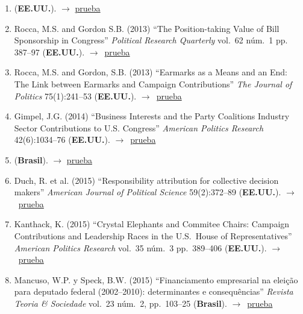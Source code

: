 \documentclass[12 pt, letter]{article}
\newenvironment{CitasMiTrabajo}{
    \begin{footnotesize}
    \begin{enumerate}[label={\footnotesize\emph{cita~\arabic*}},ref=\arabic*] %
        \setlength{\itemsep}{.1\itemsep}
        \setlength{\parskip}{.1\parskip}
    }{\end{enumerate}\end{footnotesize}}
\begin{document}
\begin{CitasMiTrabajo}
        \item {} (\textbf{EE.UU.}). $\rightarrow$ \href{http://ericmagar.com/cv/cites/coxMagar/jenkins.monroeBuyNegAgenda2012ajps.pdf}{prueba}

        \item Rocca, M.S. and Gordon S.B. (2013) ``The Position-taking Value of Bill Sponsorship in Congress'' \emph{Political Research Quarterly} vol.\ 62 n\'um.\ 1 pp. 387--97 (\textbf{EE.UU.}). $\rightarrow$~\href{http://ericmagar.com/cv/cites/coxMagar/rocca.gordonPosTakSponsoring2010prq.pdf}{prueba}

        \item Rocca, M.S. and Gordon, S.B. (2013) ``Earmarks as a Means and an End: The Link between Earmarks and Campaign Contributions'' \emph{The Journal of Politics} 75(1):241--53 (\textbf{EE.UU.}). $\rightarrow$~\href{http://ericmagar.com/cv/cites/coxMagar/rocca.gordonEarmarks2013jop.pdf}{prueba}

        \item Gimpel, J.G. (2014) ``Business Interests and the Party Coalitions Industry Sector Contributions to U.S. Congress'' \emph{American Politics Research} 42(6):1034--76 (\textbf{EE.UU.}). $\rightarrow$~\href{http://ericmagar.com/cv/cites/coxMagar/gimpel.etalBusPacs2014apr.pdf}{prueba}

        \item {} (\textbf{Brasil}). $\rightarrow$ \href{http://ericmagar.com/cv/cites/coxMagar/castroAccountBrasil2014opPub.pdf}{prueba}

        \item Duch, R. et al. (2015) ``Responsibility attribution for collective decision makers'' \emph{American Journal of Political Science} 59(2):372--89 (\textbf{EE.UU.}). $\rightarrow$~\href{http://ericmagar.com/cv/cites/coxMagar/duch.etalAttribution2015ajps.pdf}{prueba}

        \item Kanthack, K. (2015) ``Crystal Elephants and Commitee Chairs: Campaign Contributions and Leadership Races in the U.S.\ House of Representatives'' \emph{American Politics Research} vol.\ 35 n\'um.\ 3 pp.\ 389--406 (\textbf{EE.UU.}). $\rightarrow$~\href{http://ericmagar.com/cv/cites/coxMagar/kanthak.ContributionsChairs2007apr.pdf}{prueba}

        \item Mancuso, W.P. y Speck, B.W. (2015)
        ``Financiamento empresarial na elei{\c c}\~ao para deputado federal (2002--2010): determinantes e consequ\^encias''
        \emph{Revista Teoria \& Sociedade} vol.\ 23 n\'um.\ 2, pp.\ 103--25 (\textbf{Brasil}). $\rightarrow$~\href{http://ericmagar.com/cv/cites/coxMagar/mancuso2015financiamento.pdf}{prueba}


\end{CitasMiTrabajo}
\end{document}

